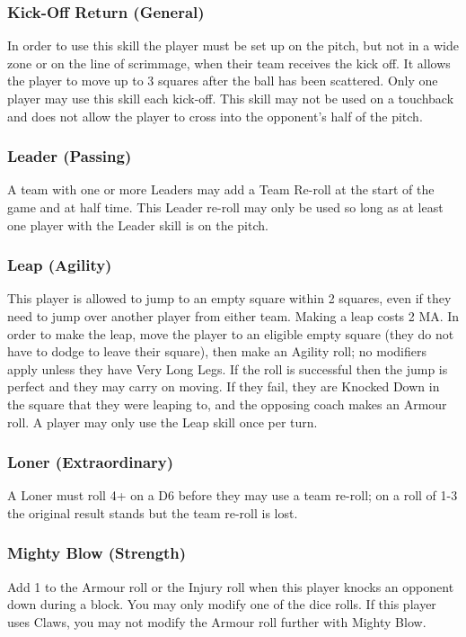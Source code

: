 \documentclass{article}
\begin{document}
\begin{multicols}{3}
\subsubsection{Kick-Off Return (General)}
\par In order to use this skill the player must be set up on the pitch, but not in a wide zone or on the line of scrimmage, when their team receives the kick off. It allows the player to move up to 3 squares after the ball has been scattered. Only one player may use this skill each kick-off. This skill may not be used on a touchback and does not allow the player to cross into the opponent's half of the pitch.

\subsubsection{Leader (Passing)}
\par A team with one or more Leaders may add a Team Re-roll at the start of the game and at half time. This Leader re-roll may only be used so long as at least one player with the Leader skill is on the pitch.

\subsubsection{Leap (Agility)}
\par This player is allowed to jump to an empty square within 2 squares, even if they need to jump over another player from either team. Making a leap costs 2 MA. In order to make the leap, move the player to an eligible empty square (they do not have to dodge to leave their square), then make an Agility roll; no modifiers apply unless they have Very Long Legs. If the roll is successful then the jump is perfect and they may carry on moving. If they fail, they are Knocked Down in the square that they were leaping to, and the opposing coach makes an Armour roll. A player may only use the Leap skill once per turn.

\subsubsection{Loner (Extraordinary)}
\par A Loner must roll 4+ on a D6 before they may use a team re-roll; on a roll of 1-3 the original result stands but the team re-roll is lost.

\subsubsection{Mighty Blow (Strength)}
\par Add 1 to the Armour roll or the Injury roll when this player knocks an opponent down during a block. You may only modify one of the dice rolls. If this player uses Claws, you may not modify the Armour roll further with Mighty Blow.


\end{multicols}
\end{document}
